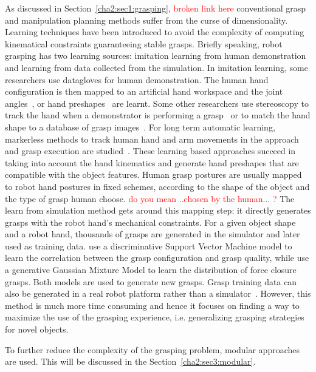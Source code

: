 As discussed in Section~\ref{cha2:sec1:grasping},
\textcolor{red}{broken link here}
conventional grasp and manipulation planning methods suffer from the curse of dimensionality.
Learning techniques have been introduced to avoid the complexity of computing kinematical constraints guaranteeing stable grasps. Briefly speaking, robot grasping has two learning sources: imitation learning from human demonstration and learning from data collected from the simulation.
In imitation learning, some researchers use datagloves for human demonstration. The human hand configuration is then mapped to an artificial hand workspace and the joint angles~\citep{Fischer1998,ekvall2007learning}, or hand preshapes~\citep{Kyota2005, pelossof2004svm, Li07} are learnt. Some other researchers use stereoscopy to track the hand when a demonstrator is performing a grasp~\citep{hueser2006learning} or to match the hand shape to a database of grasp images~\citep{Romero2008}. For long term automatic learning, markerless methods to track human hand and arm movements in the approach and grasp execution are studied~\citep{ekvall2007learning,do2009grasp}. These learning based approaches succeed in taking into account the hand kinematics and generate hand preshapes that are compatible with the object features. Human grasp postures are usually mapped to robot hand postures in fixed schemes, according to the shape of the object and the type of grasp human choose.
\textcolor{Red}{do you mean ..chosen by the human... ?}
The learn from simulation method gets around this mapping step: it directly generates grasps with the robot hand's mechanical constraints. For a given object shape and a robot hand, thousands of grasps are generated in the simulator and later used as training data. \citet{pelossof2004svm} use a discriminative Support Vector Machine model to learn the correlation between the grasp configuration and grasp quality, while \citet{bidan2013grasp} use a generative Gaussian Mixture Model to learn the distribution of force closure grasps. Both models are used to generate new grasps. Grasp training data can also be generated in a real robot platform rather than a simulator~\citep{herzog2014learning}. However, this method is much more time consuming and hence it focuses on finding a way to maximize the use of the grasping experience, i.e. generalizing grasping strategies for novel objects.

To further reduce the complexity of the grasping problem, modular approaches are used. This will be discussed in the Section~\ref{cha2:sec3:modular}.


